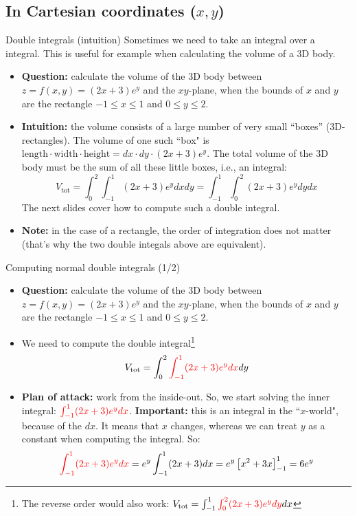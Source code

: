 \subsection{In Cartesian coordinates ($x,y$)}
\begin{frame}{Double integrals (intuition)}
    Sometimes we need to take an integral over a integral.
    This is useful for example when calculating the volume of a 3D body.
    \begin{itemize}
        \item \textbf{Question:} calculate the volume of the 3D body between $z=f(x,y)=(2x+3)e^y$ and the $xy$-plane, when the bounds of $x$ and $y$ are the rectangle $-1\leq x\leq1$ and $0\leq y\leq2$.
        \item \textbf{Intuition:} the volume consists of a large number of very small ``boxes'' (3D-rectangles). The volume of one such ``box" is $\text{length}\cdot\text{width}\cdot\text{height}=dx\cdot dy\cdot(2x+3)e^y$. The total volume of the 3D body must be the sum of all these little boxes, i.e., an integral:
            \[V_{\text{tot}}=\int_{0}^{2}\int_{-1}^{1}(2x+3)e^y dxdy=\int_{-1}^{1}\int_{0}^{2}(2x+3)e^y dydx\]
        The next slides cover how to compute such a double integral.
    \item    \textbf{Note:} in the case of a rectangle, the order of integration does not matter (that's why the two double integals above are equivalent).
    \end{itemize}
\end{frame}

\begin{frame}{Computing normal double integrals (1/2)}
    \begin{itemize}
        \item \textbf{Question:} calculate the volume of the 3D body between $z=f(x,y)=(2x+3)e^y$ and the $xy$-plane, when the bounds of $x$ and $y$ are the rectangle $-1\leq x\leq1$ and $0\leq y\leq2$.
        \item We need to compute the double integral\footnote{The reverse order would also work:
            $V_{\text{tot}}=\int_{-1}^{1}\textcolor{red}{\int_{0}^{2}(2x+3)e^y dy}dx$}
            \[V_{\text{tot}}=\int_{0}^{2}\textcolor{red}{\int_{-1}^{1}(2x+3)e^y dx}dy\]
        \item \textbf{Plan of attack:} work from the inside-out. So, we start solving the inner integral: $\textcolor{red}{\int_{-1}^{1}(2x+3)e^y dx}$. \textbf{Important:} this is an integral in the ``$x$-world", because of the $dx$. It means that $x$ changes, whereas we can treat $y$ as a constant when computing the integral. So:
            \[\textcolor{red}{\int_{-1}^{1}(2x+3)e^y dx}=e^y\int_{-1}^1(2x+3)dx=e^y\left[x^2+3x\right]_{-1}^1=6e^y\]
    \end{itemize}
\end{frame}

